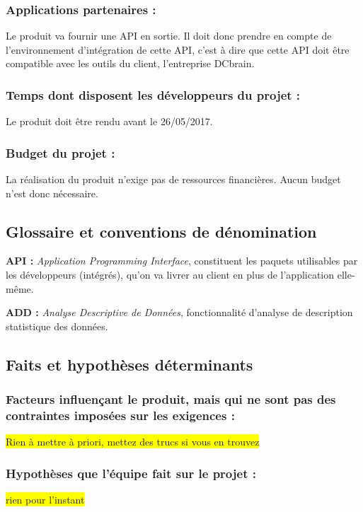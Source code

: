 			\subsubsection{Applications partenaires :}
				Le produit va fournir une API en sortie. Il doit donc prendre en compte de l'environnement d'intégration de cette API, c'est à dire que cette API doit être compatible avec les outils du client, l'entreprise DCbrain.
				
			\subsubsection{Temps dont disposent les développeurs du projet :}
				Le produit doit être rendu avant le 26/05/2017.
				
			\subsubsection{Budget du projet :}
				La réalisation du produit n'exige pas de ressources financières. Aucun budget n'est donc nécessaire.
		
		\subsection{Glossaire et conventions de dénomination}
			\begin{description}[style=unboxed,leftmargin=0.2cm]
			\item\textbf{API :} \textit{Application Programming Interface}, constituent les paquets utilisables par les développeurs (intégrés), qu'on va livrer au client en plus de l'application elle-même.
			\item\textbf{ADD :} \textit{Analyse Descriptive de Données}, fonctionnalité d'analyse de description statistique des données.
			\end{description}
			
		\subsection{Faits et hypothèses déterminants}
			\subsubsection{Facteurs influençant le produit, mais qui ne sont pas des contraintes imposées sur les exigences :}
				\colorbox{yellow}{Rien à mettre à priori, mettez des trucs si vous en trouvez}
			\subsubsection{Hypothèses que l’équipe fait sur le projet :}
				\colorbox{yellow}{rien pour l'instant}
		

